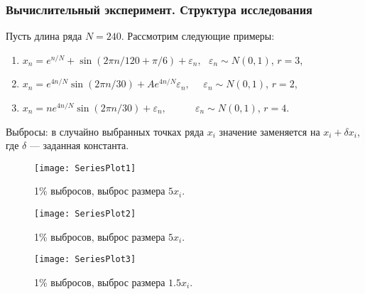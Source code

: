 \documentclass[10pt, ucs, notheorems, handout]{beamer}
\begin{document}
\begin{frame}
\frametitle{Вычислительный эксперимент. Структура исследования}
Пусть длина ряда $N=240$. Рассмотрим следующие примеры: 
\begin{enumerate}
\item $x_n= e^{n/N}+\sin{(2\pi n/120+\pi/6)}+\varepsilon_n, ~~~ \varepsilon_n \sim N(0,1)$,  $r=3$,
\item $x_n=e^{4n/N} \sin(2\pi n/30) + Ae^{4n/N}\varepsilon_n, ~~~~~~ \varepsilon_n \sim N(0,1)$,  $r=2$,
\item $x_n= ne^{4n/N}\sin{(2\pi n/30)}+\varepsilon_n, ~~~~~~~~~~~~~ \varepsilon_n \sim N(0,1)$,  $r=4$.
\end{enumerate}	
Выбросы: в случайно выбранных точках ряда $x_i$ значение заменяется на $x_i + \delta x_i$, где $\delta$ --- заданная константа.
\def\figurename{Пр. 1}
\begin{figure}[h]
\begin{center}
\begin{minipage}[h]{0.32\linewidth}
\texttt{[image: SeriesPlot1]}
\caption{1\% выбросов, выброс размера $5x_i$.} %
\end{minipage}
\hfill
\def\figurename{Пр. 2}
\begin{minipage}[h]{0.32\linewidth}
\texttt{[image: SeriesPlot2]}
\caption{1\% выбросов, выброс размера $5x_i$.}
\end{minipage}
\hfill
\def\figurename{Пр. 3}
\begin{minipage}[h]{0.32\linewidth}
\texttt{[image: SeriesPlot3]}
\caption{1\% выбросов, выброс размера $1.5x_i$.}
\end{minipage}
\end{center}
\end{figure}
\def\figurename{Рис.}
\end{frame}
\end{document}
